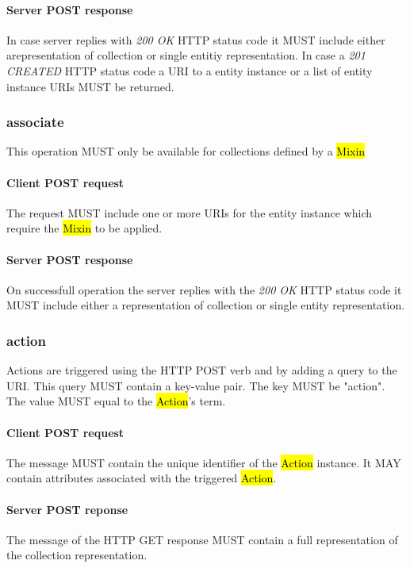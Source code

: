 \documentclass[10pt,a4paper]{article}
\begin{document}
\paragraph{Server POST response}
In case server replies with \emph{200 OK} HTTP status code it MUST include either arepresentation of collection or single entitiy representation. In case a \emph{201 CREATED} HTTP status code a URI to a entity instance or a list of entity instance URIs MUST be returned.

\subsubsection{associate}
This operation MUST only be available for collections defined by a \hl{Mixin}

\paragraph{Client POST request}
The request MUST include one or more URIs for the entity instance which require the \hl{Mixin} to be applied.

\paragraph{Server POST response}
On successfull operation the server replies with the \emph{200 OK} HTTP status code it MUST include either a representation of collection or single entity representation. 

\subsubsection{action}
Actions are triggered using the HTTP POST verb and by adding a query to the URI. This query MUST contain a key-value pair. The key MUST be "action". The value MUST equal to the \hl{Action}'s term.

\paragraph{Client POST request}
The message MUST contain the unique identifier of the \hl{Action} instance. It MAY contain attributes associated with the triggered \hl{Action}.

\paragraph{Server POST reponse}
The message of the HTTP GET response MUST contain a full representation of the collection representation.
\end{document}
